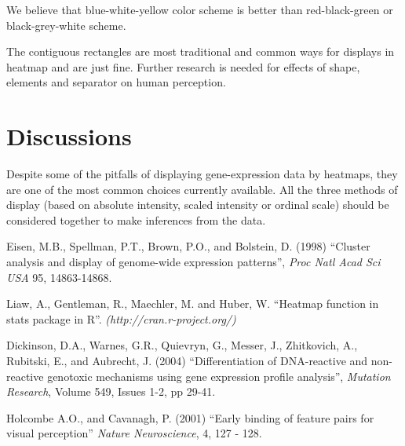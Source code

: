\documentclass[12pt, oneside, letterpaper]{article}
\begin{document}
   	We believe that blue-white-yellow color scheme
   	is better than red-black-green or black-grey-white
   	scheme. 

	The contiguous rectangles are most traditional and common
	ways for displays in heatmap and are just fine. Further
	research is needed for effects of shape, elements and
	separator on human perception.


\section*{Discussions}

	Despite some of the pitfalls of displaying gene-expression
	data by heatmaps, they are one of the most common choices
	currently available. All the three methods of display (based
	on absolute intensity, scaled intensity or ordinal scale)
	should be considered together to make inferences from the
	data.


\begin{thebibliography}{99}

 Eisen, M.B., Spellman, P.T., Brown, P.O., and
Bolstein, D. (1998) ``Cluster analysis and display of genome-wide
expression patterns'', \textit{Proc Natl Acad Sci USA} 95, 14863-14868.

   Liaw, A., Gentleman, R., Maechler, M. and  Huber, W.
``Heatmap function in stats package in R''. \textit{(http://cran.r-project.org/)}

 Dickinson, D.A., Warnes, G.R., Quievryn, G., Messer, J.,
Zhitkovich, A., Rubitski, E., and Aubrecht, J. (2004) ``Differentiation of
DNA-reactive and non-reactive genotoxic mechanisms using gene
expression profile analysis'', \textit{Mutation Research}, Volume 549, Issues
1-2, pp 29-41.


 Holcombe A.O., and Cavanagh, P. (2001) ``Early
binding of feature pairs for visual perception'' \textit{Nature Neuroscience},  4, 127 - 128.




\end{thebibliography}
\end{document}
